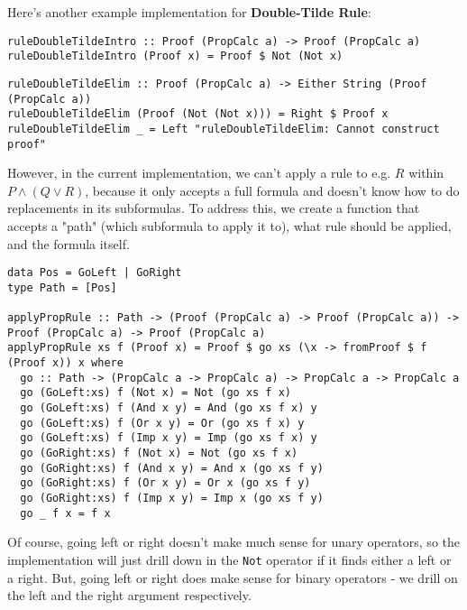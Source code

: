 \documentclass{article}
\begin{document}
Here's another example implementation for \textbf{Double-Tilde Rule}:

\begin{minipage}{0.49\textwidth}
\begin{lstlisting}
ruleDoubleTildeIntro :: Proof (PropCalc a) -> Proof (PropCalc a)
ruleDoubleTildeIntro (Proof x) = Proof $ Not (Not x)
\end{lstlisting}
\end{minipage}
\begin{minipage}{0.49\textwidth}
\begin{lstlisting}
ruleDoubleTildeElim :: Proof (PropCalc a) -> Either String (Proof (PropCalc a))
ruleDoubleTildeElim (Proof (Not (Not x))) = Right $ Proof x
ruleDoubleTildeElim _ = Left "ruleDoubleTildeElim: Cannot construct proof"
\end{lstlisting}
\end{minipage}

However, in the current implementation, we can't apply a rule to e.g. $R$ within $P \land (Q \lor R)$, because it only accepts a full formula and doesn't know how to do replacements in its subformulas. To address this, we create a function that accepts a "path" (which subformula to apply it to), what rule should be applied, and the formula itself.

\begin{lstlisting}
data Pos = GoLeft | GoRight
type Path = [Pos]

applyPropRule :: Path -> (Proof (PropCalc a) -> Proof (PropCalc a)) -> Proof (PropCalc a) -> Proof (PropCalc a)
applyPropRule xs f (Proof x) = Proof $ go xs (\x -> fromProof $ f (Proof x)) x where
  go :: Path -> (PropCalc a -> PropCalc a) -> PropCalc a -> PropCalc a
  go (GoLeft:xs) f (Not x) = Not (go xs f x)
  go (GoLeft:xs) f (And x y) = And (go xs f x) y
  go (GoLeft:xs) f (Or x y) = Or (go xs f x) y
  go (GoLeft:xs) f (Imp x y) = Imp (go xs f x) y
  go (GoRight:xs) f (Not x) = Not (go xs f x)
  go (GoRight:xs) f (And x y) = And x (go xs f y)
  go (GoRight:xs) f (Or x y) = Or x (go xs f y)
  go (GoRight:xs) f (Imp x y) = Imp x (go xs f y)
  go _ f x = f x
\end{lstlisting}

Of course, going left or right doesn't make much sense for unary operators, so the implementation will just drill down in the \texttt{Not} operator if it finds either a left or a right. But, going left or right does make sense for binary operators - we drill on the left and the right argument respectively.
\end{document}
